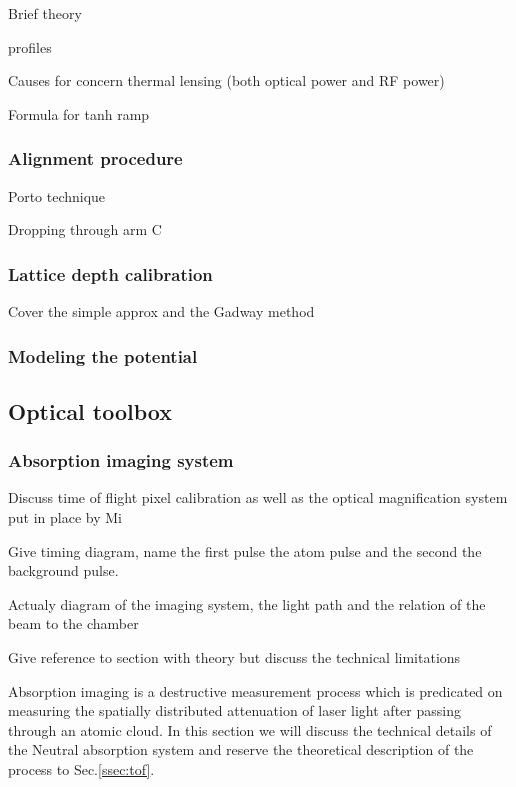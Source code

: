 Brief theory

profiles

Causes for concern
	thermal lensing (both optical power and RF power)
	
Formula for tanh ramp

\subsubsection{Alignment procedure} \label{sssec:532_align}

Porto technique

Dropping through arm C

\subsubsection{Lattice depth calibration} \label{sssec:532_lattice_depth}

Cover the simple approx and the Gadway method

\subsubsection{Modeling the potential} \label{sssec:532_modeling}

\subsection{Optical toolbox}
\label{ssec:op_tools}

\subsubsection{Absorption imaging system}

Discuss time of flight pixel calibration as well as the optical magnification system put in place by Mi

Give timing diagram, name the first pulse the atom pulse and the second the background pulse.

Actualy diagram of the imaging system, the light path and the relation of the beam to the chamber

Give reference to section with theory but discuss the technical limitations
 
Absorption imaging is a destructive measurement process which is predicated on measuring the spatially distributed attenuation of laser light after passing through an atomic cloud. In this section we will discuss the technical details of the Neutral absorption system and reserve the theoretical description of the process to Sec.\ref{ssec:tof}. 

